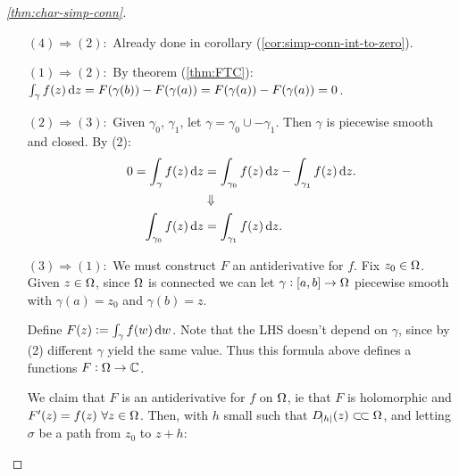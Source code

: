 \begin{proof}[\ref{thm:char-simp-conn}]
\begin{enumerate}
    \item[$(4)\Rightarrow (2):$] Already done in corollary (\ref{cor:simp-conn-int-to-zero}).
    \item[$(1)\Rightarrow (2):$] By theorem (\ref{thm:FTC}): $\int_\gamma f(z) \dif z = F(\gamma(b)) - F(\gamma(a)) = F(\gamma(a)) - F(\gamma(a)) = 0$.
    \item[$(2)\Rightarrow (3):$] Given $\gamma_0, \, \gamma_1$, let $\gamma = \gamma_0 \cup -\gamma_1$. Then $\gamma$ is piecewise smooth and closed. By (2):
    \begin{align*}
        0= \int_\gamma f(z) \dif z &= \int_{\gamma_0} f(z) \dif z - \int_{\gamma_1} f(z) \dif z.\\
        &\Downarrow\\
        \int_{\gamma_0} f(z) \dif z &= \int_{\gamma_1} f(z) \dif z.
    \end{align*}
    
    \item[$(3)\Rightarrow (1):$] We must construct $F$ an antiderivative for $f$. Fix $z_0 \in \Omega$. Given $z \in \Omega$, since $\Omega$ is connected we can let $\gamma: [a,b] \to \Omega$ piecewise smooth with $\gamma(a) = z_0$ and $\gamma(b) = z$.
    
\begin{center}
\end{center}
    
    Define $F(z) \defas \int_\gamma f(w) \dif w$. Note that the LHS doesn't depend on $\gamma$, since by (2) different $\gamma$ yield the same value. Thus this formula above defines a functions $F: \Omega \to \mathbb{C}$.
    
    
    
    We claim that $F$ is an antiderivative for $f$ on $\Omega$, ie that $F$ is holomorphic and $F'(z) = f(z) \, \, \forall z \in \Omega$. Then, with $h$ small such that $D_{\abs{h}} (z) \ssubset \om$, and letting $\sigma$ be a path from $z_0$ to $z+h$:
        \begin{center}
\end{center}
\end{enumerate}
\end{proof}
